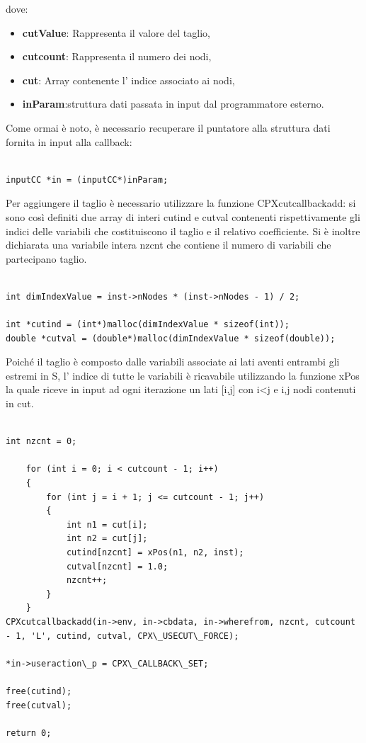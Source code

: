 \documentclass[11pt]{article}
\begin{document}
dove:

\begin{itemize}
	\item \textbf{cutValue}: Rappresenta il valore del taglio,
	\item \textbf{cutcount}: Rappresenta il numero dei nodi,
	\item \textbf{cut}: Array contenente l' indice associato ai nodi,
	\item \textbf{inParam}:struttura dati passata in input dal programmatore esterno.
\end{itemize}

Come ormai è noto, è necessario recuperare il puntatore alla struttura dati fornita in input alla callback:

\begin{lstlisting}

inputCC *in = (inputCC*)inParam;

\end{lstlisting}

Per aggiungere il taglio è necessario utilizzare la funzione CPXcutcallbackadd: si sono così definiti due array di interi cutind e cutval contenenti rispettivamente gli indici delle variabili che costituiscono il taglio e il relativo coefficiente. Si è inoltre dichiarata una variabile intera nzcnt che contiene il numero di variabili che partecipano taglio. 

\begin{lstlisting}

int dimIndexValue = inst->nNodes * (inst->nNodes - 1) / 2; 

int *cutind = (int*)malloc(dimIndexValue * sizeof(int));
double *cutval = (double*)malloc(dimIndexValue * sizeof(double));
\end{lstlisting}


Poiché il taglio è composto dalle variabili associate ai lati aventi entrambi gli estremi in S, l’ indice di tutte le variabili è ricavabile utilizzando la funzione xPos la quale riceve in input ad ogni iterazione un lati [i,j] con i<j e i,j nodi contenuti in cut. 

\begin{lstlisting}

int nzcnt = 0;

	for (int i = 0; i < cutcount - 1; i++)
	{
		for (int j = i + 1; j <= cutcount - 1; j++)
		{
			int n1 = cut[i];
			int n2 = cut[j];
			cutind[nzcnt] = xPos(n1, n2, inst);
			cutval[nzcnt] = 1.0;
			nzcnt++;
		}
	}
CPXcutcallbackadd(in->env, in->cbdata, in->wherefrom, nzcnt, cutcount - 1, 'L', cutind, cutval, CPX\_USECUT\_FORCE);

*in->useraction\_p = CPX\_CALLBACK\_SET;

free(cutind);
free(cutval);

return 0;

\end{lstlisting}
\end{document}
